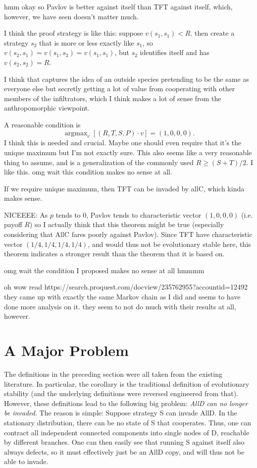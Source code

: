 \documentclass[11pt]{amsart}
\DeclareMathOperator*{\argmax}{argmax}
\theoremstyle{definition}
\theoremstyle{remark}
\begin{document}
hmm okay so Pavlov is better against itself than TFT against itself, which, however, we have seen doesn't matter much.


I think the proof strategy is like this: suppose $v(s_1,s_1) < R$. then create a strategy $s_2$ that is more or less exactly like $s_1$, so $v(s_2,s_1) = v(s_1,s_2) = v(s_1,s_1)$, but $s_2$ identifies itself and has $v(s_2,s_2) = R$.

I think that captures the idea of an outside species pretending to be the same as everyone else but secretly getting a lot of value from cooperating with other members of the infiltrators, which I think makes a lot of sense from the anthropomorphic viewpoint.

A reasonable condition is \begin{equation*}
  \argmax_v \left[ (R, T, S, P) \cdot v \right] = (1, 0, 0, 0).
\end{equation*}
I think this is needed and crucial. Maybe one should even require that it's the unique maximum but I'm not exactly sure. This also seems like a very reasonable thing to assume, and is a generalization of the commonly used $R \geq (S + T)/2$. I like this. omg wait this condition makes no sense at all.

If we require unique maximum, then TFT can be invaded by allC, which kinda makes sense.

NICEEEE: As $p$ tends to 0, Pavlov tends to characteristic vector $(1,0,0,0)$ (i.e. payoff $R$) so I actually think that this theorem might be true (especially considering that AllC fares poorly against Pavlov). Since TFT have characteristic vector $(1/4,1/4,1/4,1/4)$, and would thus not be evolutionary stable here, this theorem indicates a stronger result than the theorem that it is based on.

omg wait the condition I proposed makes no sense at all hmmmm

oh wow read https://search.proquest.com/docview/235762955?accountid=12492 they came up with exactly the same Markov chain as I did and seems to have done more analysis on it. they seem to not do much with their results at all, however.

\section*{A Major Problem}

The definitions in the preceding section were all taken from the existing literature. In particular, the corollary is the traditional definition of evolutionary stability (and the underlying definitions were reversed engineered from that). However, these definitions lead to the following big problem: \textit{AllD can no longer be invaded}. The reason is simple: Suppose strategy S can invade AllD. In the stationary distribution, there can be no state of S that cooperates. Thus, one can contract all independent connected components into single nodes of D, reachable by different branches. One can then easily see that running S against itself also always defects, so it must effectively just be an AllD copy, and will thus not be able to invade.
\end{document}
